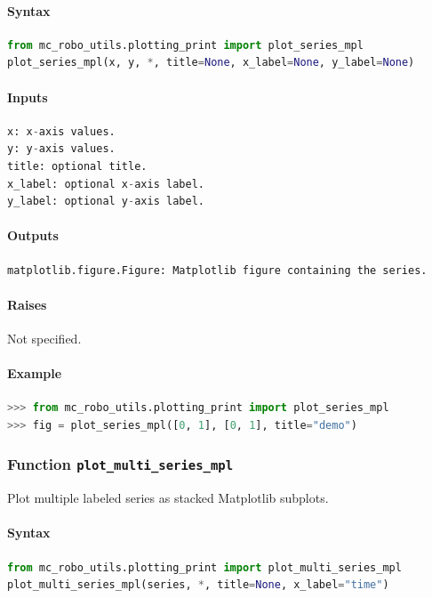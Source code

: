 \documentclass[11pt]{article}
\begin{document}
\paragraph{Syntax}
\begin{lstlisting}[language=Python]
from mc_robo_utils.plotting_print import plot_series_mpl
plot_series_mpl(x, y, *, title=None, x_label=None, y_label=None)
\end{lstlisting}
\paragraph{Inputs}
\begin{lstlisting}[language=Python]
x: x-axis values.
y: y-axis values.
title: optional title.
x_label: optional x-axis label.
y_label: optional y-axis label.
\end{lstlisting}
\paragraph{Outputs}
\begin{lstlisting}[language=Python]
matplotlib.figure.Figure: Matplotlib figure containing the series.
\end{lstlisting}
\paragraph{Raises}
Not specified.
\paragraph{Example}
\begin{lstlisting}[language=Python]
>>> from mc_robo_utils.plotting_print import plot_series_mpl
>>> fig = plot_series_mpl([0, 1], [0, 1], title="demo")
\end{lstlisting}

\subsubsection{Function \texttt{plot\_multi\_series\_mpl}}
Plot multiple labeled series as stacked Matplotlib subplots.

\paragraph{Syntax}
\begin{lstlisting}[language=Python]
from mc_robo_utils.plotting_print import plot_multi_series_mpl
plot_multi_series_mpl(series, *, title=None, x_label="time")
\end{lstlisting}
\end{document}
